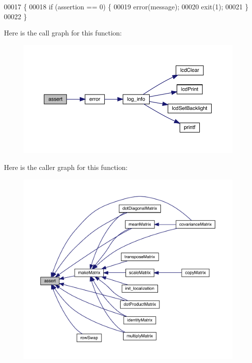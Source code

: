 \begin{DoxyCode}
00017                                                 \{
00018   \textcolor{keywordflow}{if} (assertion == 0) \{
00019     error(message);
00020     exit(1);
00021   \}
00022 \}
\end{DoxyCode}
Here is the call graph for this function\+:
\nopagebreak
\begin{figure}[H]
\begin{center}
\leavevmode
\includegraphics[width=350pt]{matrix_8c_a8e41e30382335ea89f90b72db0b44d6f_cgraph}
\end{center}
\end{figure}
Here is the caller graph for this function\+:
\nopagebreak
\begin{figure}[H]
\begin{center}
\leavevmode
\includegraphics[width=350pt]{matrix_8c_a8e41e30382335ea89f90b72db0b44d6f_icgraph}
\end{center}
\end{figure}
\mbox{\label{matrix_8c_abbb8d2d20c2dd53a2269d017a336668f}} 
